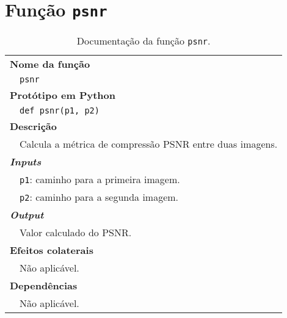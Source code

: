 
\newpage
\section{Função \texttt{psnr}}
\label{sec::doc-codigo:psnr}

\begin{table}[!hp]
    \centering
    \caption{Documentação da função \texttt{psnr}.}
    \label{tab:psnr}
    \begin{tabular}{p{1cm} p{11.5cm}}
        \hline
        \multicolumn{2}{l}{\bfseries\small Nome da função}\\
         & \verb|psnr|\\
        \hline
        \multicolumn{2}{l}{\bfseries\small Protótipo em Python}\\
         & \texttt{def psnr(p1, p2)} \\
        \hline\multicolumn{2}{l}{\bfseries\small Descrição}\\
         & Calcula a métrica de compressão \ac{PSNR} entre duas imagens. \\
        \hline\multicolumn{2}{l}{\bfseries\small \textit{Inputs}}\\
         & \verb|p1|: caminho para a primeira imagem. \\
         & \verb|p2|: caminho para a segunda imagem. \\
        \hline\multicolumn{2}{l}{\bfseries\small \textit{Output}}\\
         & Valor calculado do \ac{PSNR}. \\
        \hline\multicolumn{2}{l}{\bfseries\small Efeitos colaterais}\\
         & Não aplicável. \\
        \hline\multicolumn{2}{l}{\bfseries\small Dependências}\\
         & Não aplicável. \\
        \hline
    \end{tabular}
\end{table}
